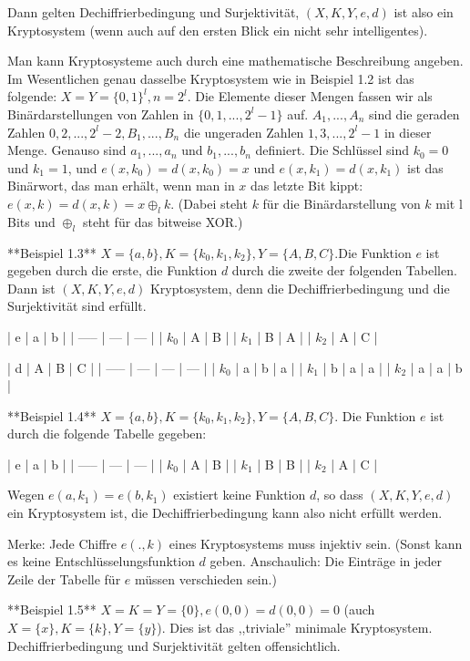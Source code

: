 \documentclass[a4paper]{article}
\begin{document}
\begin{multicols}{3}
Dann gelten Dechiffrierbedingung und Surjektivität, $(X,K,Y,e,d)$ ist also ein Kryptosystem (wenn auch auf den ersten Blick ein nicht sehr intelligentes).

Man kann Kryptosysteme auch durch eine mathematische Beschreibung angeben. Im Wesentlichen genau dasselbe Kryptosystem wie in Beispiel 1.2 ist das folgende: $X=Y=\{0,1\}^l,n=2^l$. Die Elemente dieser Mengen fassen wir als Binärdarstellungen von Zahlen in $\{0, 1,..., 2^l-1\}$ auf. $A_1,...,A_n$ sind die geraden Zahlen $0,2,...,2^l-2,B_1,...,B_n$ die ungeraden Zahlen $1,3,...,2^l- 1$ in dieser Menge.
Genauso sind $a_1,...,a_n$ und $b_1,...,b_n$ definiert. Die Schlüssel sind $k_0=0$ und $k_1=1$, und $e(x,k_0)=d(x,k_0)=x$ und $e(x,k_1)=d(x,k_1)$ ist das Binärwort, das man erhält, wenn man in $x$ das letzte Bit kippt: $e(x,k) =d(x,k) =x\oplus_l k$. 
(Dabei steht $k$ für die Binärdarstellung von $k$ mit l Bits und $\oplus_l$ steht für das bitweise XOR.)

**Beispiel 1.3** $X=\{a,b\},K=\{k_0,k_1,k_2\},Y=\{A,B,C\}$.Die Funktion $e$ ist gegeben durch die erste, die Funktion $d$ durch die zweite der folgenden Tabellen. Dann ist $(X,K,Y,e,d)$ Kryptosystem, denn die Dechiffrierbedingung und die Surjektivität sind erfüllt.

| e     | a   | b   |
| ----- | --- | --- |
| $k_0$ | A   | B   |
| $k_1$ | B   | A   |
| $k_2$ | A   | C   |

| d     | A   | B   | C   |
| ----- | --- | --- | --- |
| $k_0$ | a   | b   | a   |
| $k_1$ | b   | a   | a   |
| $k_2$ | a   | a   | b   |

**Beispiel 1.4** $X=\{a,b\},K=\{k_0,k_1,k_2\},Y=\{A,B,C\}$. Die Funktion $e$ ist durch die folgende Tabelle gegeben:

| e     | a   | b   |
| ----- | --- | --- |
| $k_0$ | A   | B   |
| $k_1$ | B   | B   |
| $k_2$ | A   | C   |

Wegen $e(a,k_1)=e(b,k_1)$ existiert keine Funktion $d$, so dass $(X,K,Y,e,d)$ ein Kryptosystem ist, die Dechiffrierbedingung kann also nicht erfüllt werden.

Merke: Jede Chiffre $e(.,k)$ eines Kryptosystems muss injektiv sein. (Sonst kann es keine Entschlüsselungsfunktion $d$ geben. Anschaulich: Die Einträge in jeder Zeile der Tabelle für $e$ müssen verschieden sein.)

**Beispiel 1.5** $X=K=Y=\{0\},e(0,0)=d(0,0)=0$ (auch $X=\{x\},K=\{k\},Y=\{y\}$). Dies ist das ,,triviale'' minimale Kryptosystem. Dechiffrierbedingung und Surjektivität gelten offensichtlich.


\end{multicols}
\end{document}
